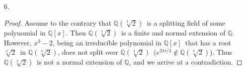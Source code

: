 \documentclass[12pt]{article}
\newcommand{\Q}{\mathbb{Q}}
\begin{document}
\begin{enumerate}
\begin{proof}
	\end{proof}
	\item[6.]
	\begin{proof}
		\quad Assume to the contrary that $\Q(\sqrt[3]{2})$\ is a splitting field of some polynomial in $\Q[x]$. Then $\Q(\sqrt[3]{2})$\ is a finite and normal extension of $\Q$. However, $x^3-2$, being an irreducible polynomial in $\Q[x]$\ that has a root $\sqrt[3]{2}$\ in $\Q(\sqrt[3]{2})$, does not split over $\Q(\sqrt[3]{2})$\ ($e^{2\pi i/3}\notin\Q(\sqrt[3]{2})$). Thus $\Q(\sqrt[3]{2})$\ is not a normal extension of $\Q$, and we arrive at a contradiction.
	\end{proof}
\end{enumerate}
\end{document}
